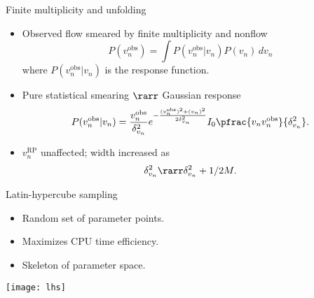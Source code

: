 \documentclass{beamer}
\begin{document}
\begin{frame}[label=unfold]{Finite multiplicity and unfolding}
  \def\obs{^\text{obs}}

  \begin{itemize}
    \item Observed flow smeared by finite multiplicity and nonflow
      \begin{equation*}
        P(v_n\obs) = \int P(v_n\obs|v_n) P(v_n) \, dv_n
      \end{equation*}
      where $P(v_n\obs|v_n)$ is the response function.
    \item Pure statistical smearing $\rarr$ Gaussian response
      \begin{equation*}
        P(v_n^\text{obs}|v_n) = \frac{v_n^\text{obs}}{\delta_{v_n}^2} e^{ -\frac{(v_n^\text{obs})^2 + (v_n)^2}{2\delta_{v_n}^2} }
          I_0 \pfrac{v_nv_n^\text{obs}}{\delta_{v_n}^2}.
      \end{equation*}
    \item $v_n^\text{RP}$ unaffected; width increased as
      \begin{equation*}
        \delta_{v_n}^2 \rarr \delta_{v_n}^2 + 1/2M.
      \end{equation*}
  \end{itemize}

\end{frame}

\begin{frame}[label=lhs]{Latin-hypercube sampling}
  \begin{itemize}
    \item Random set of parameter points.
    \item Maximizes CPU time efficiency.
    \item Skeleton of parameter space.
  \end{itemize}

  \bgs 

  \centering
  \texttt{[image: lhs]}

\end{frame}
\end{document}
